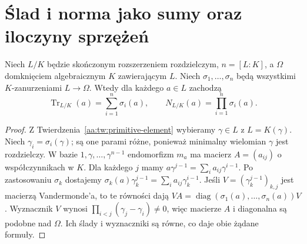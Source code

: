 \section{Ślad i norma jako sumy oraz iloczyny sprzężeń}
\begin{twierdzenie}
\label{aa:tw:trace-norm-embeddings}
Niech $L/K$ będzie skończonym rozszerzeniem rozdzielczym,
$n=[L:K]$, a $\Omega$ domknięciem algebraicznym $K$
zawierającym $L$. Niech $\sigma_1,\ldots,\sigma_n$
będą wszystkimi $K$-zanurzeniami $L\to\Omega$.
Wtedy dla każdego $a\in L$ zachodzą
\[
\operatorname{Tr}_{L/K}(a)=\sum_{i=1}^n\sigma_i(a),\qquad
N_{L/K}(a)=\prod_{i=1}^n\sigma_i(a).
\]
\end{twierdzenie}
\begin{proof}
Z Twierdzenia~\ref{aa:tw:primitive-element} wybieramy
$\gamma\in L$ z $L=K(\gamma)$. Niech $\gamma_i=\sigma_i(\gamma)$;
są one parami różne, ponieważ minimalny wielomian $\gamma$
jest rozdzielczy. W bazie $1,\gamma,\ldots,\gamma^{n-1}$
endomorfizm $m_a$ ma macierz $A=(a_{ij})$ o współczynnikach
w $K$. Dla każdego $j$ mamy
$a\gamma^{j-1}=\sum_i a_{ij}\gamma^{i-1}$.
Po zastosowaniu $\sigma_k$ dostajemy
$\sigma_k(a)\gamma_k^{j-1}=\sum_i a_{ij}\gamma_k^{i-1}$.
Jeśli $V=(\gamma_k^{j-1})_{k,j}$ jest macierzą Vandermonde'a,
to te równości dają
$VA=\operatorname{diag}(\sigma_1(a),\ldots,\sigma_n(a))V$.
Wyznacznik $V$ wynosi
$\prod_{i<j}(\gamma_j-\gamma_i)\ne0$, więc macierze
$A$ i diagonalna są podobne nad $\Omega$. Ich ślady
i wyznaczniki są równe, co daje obie żądane formuły.
\end{proof}

